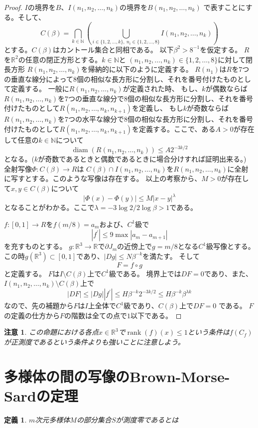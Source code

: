 \documentclass[leqno]{jsarticle}
\newtheorem{df}[thm]{定義}
\newtheorem*{cau}{注意}
\newcommand{\nn}{\mathbb{N}}
\newcommand{\rr}{\mathbb{R}}
\DeclareMathOperator{\di}{diam}
\DeclareMathOperator{\rank}{rank}
\begin{document}
\begin{proof}
$I$の境界を$B$、$I(n_1, n_2, \dots, n_k)$の境界を$B(n_1, n_2, \dots, n_k)$
で表すことにする。そして、
\[
C(\beta)=\bigcap_{k\in \nn}\left(\bigcup_{i\in \{1,2,\dots, k\},\ n_i\in \{1,2,\dots, 8\}}I(n_1, n_2, \dots, n_k)\right)
\]
とする。$C(\beta)$はカントール集合と同相である。
以下$\beta^2>8^{-1}$を仮定する。
$R$を$\rr^2$の任意の閉正方形とする。$k\in \nn$と
$(n_1,n_2, \dots, n_k)\in \{1,2,\dots, 8\}$に対して閉長方形
$R(n_1,n_2,\dots, n_k)$を帰納的に以下のように定義する。
$R(n_1)$は$R$を$7$つの垂直な線分によって$8$個の相似な長方形に分割し、それを番号付けたものとして定義する。
一般に$R(n_1,n_2,\dots, n_k)$が定義された時、
もし、$k$が偶数ならば$R(n_1,n_2,\dots, n_k)$を$7$つの垂直な線分で$8$個の相似な長方形に分割し、それを番号付けたものとして$R(n_1,n_2,\dots, n_k, n_{k+1})$を定義し、
もし$k$が奇数ならば$R(n_1,n_2,\dots, n_k)$を$7$つの水平な線分で$8$個の相似な長方形に分割し、それを番号付けたものとして$R(n_1,n_2,\dots, n_k, n_{k+1})$を定義する。ここで、ある$A>0$が存在して任意の$k\in \nn$について
\[
\di(R(n_1,n_2,\dots, n_k))\le A2^{-3k/2}
\]
となる。($k$が奇数であるときと偶数であるときに場合分けすれば証明出来る。)
全射写像$\Phi:C(\beta)\to R$は
$C(\beta)\cap I(n_1,n_2,\dots, n_k)$を$R(n_1,n_2,\dots, n_k)$に全射に写すとする。このような写像は存在する。
以上の考察から、$M>0$が存在して$x,y\in C(\beta)$について
\[
|\Phi(x)-\Phi(y)|\le M|x-y|^{\lambda}
\]
となることがわかる。ここで$\lambda=-3\log2/2\log\beta>1$である。

$f:[0,1]\to R$を$f(m/8)=a_m$および、$C^1$級で
\[
|f^{\prime}|\le 9\max|a_m-a_{m+1}|
\]
を充すものとする。
$g:\rr^3\to \rr$で$\partial J_m$の近傍上で$g=m/8$となる$C^1$級写像とする。この時$g(\rr^3)\subset [0,1]$であり、$|Dg|\le N\beta^{-k}$を満たす。
そして
\[
F=f\circ g
\]
と定義する。
$F$は$I\setminus C(\beta)$上で$C^1$級である。
境界上では$DF=0$であり、また、$I(n_1,n_2,\dots, n_k)\setminus C(\beta)$上で
\[
|DF|\le |Dg||f^{\prime}|\le H\beta^{-k}2^{-3k/2}\le H \beta^{-k}\beta^{\lambda k}
\]
なので、先の補題から$F$は$I$上全体で$C^1$級であり、$C(\beta)$上で$DF=0$
である。
$F$の定義の仕方から$F$の階数は全ての点で$1$以下である。
\end{proof}
\begin{cau}
この命題における各点$x\in \rr^3$で$\rank(f)(x)\le 1$という条件は$f(C_f)$が正測度であるという条件よりも強いことに注意しよう。
\end{cau}



\section{多様体の間の写像のBrown-Morse-Sardの定理}
\begin{df}
$m$次元多様体$M$の部分集合$S$が測度零であるとは
\end{df}
\end{document}
